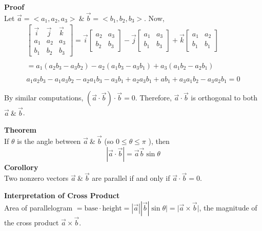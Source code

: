 \documentclass{article}
\begin{document}
  \textbf{Proof}\\
  Let $ \vec{ a } = < a_1, a_2, a_3> ~ \&~ \vec{ b } = < b_1, b_2, b_3>    $. Now,
  \[
    \begin{gathered}
    \begin{bmatrix}
      \vec{ i } & \vec{ j } & \vec{ k }\\
      a_1 &a_2 &a_3\\
      b_1 &b_2 &b_3
    \end{bmatrix}
    = \vec{ i } \begin{bmatrix}
      a_2 &a_3\\
      b_2 &b_3
    \end{bmatrix} - 
    \vec{ j } \begin{bmatrix}
      a_1 &a_3\\
      b_1 &b_3
    \end{bmatrix} + 
    \vec{ k } \begin{bmatrix}
      a_1 &a_2\\
      b_1 &b_1
    \end{bmatrix}\\
    ~\\
     = a_{1}  (a_2b_3-a_3b_2) - a_{2}  (a_1b_3 - a_3b_1) + a_{3} (a_1b_2 - a_2b_{1})\\
     ~\\
     a_{1}a_{2}b_{3}-a_{1}a_{3}b_{2}-a_{2}a_{1}b_{3}-a_{3}b_{1}+a_{2}a_{3}b_{1}+ab_{1}+a_{3}a_{1}b_{2}-a_{3}a_{2}b_{1}=0\\
     ~\\
    \end{gathered}
  \]
    By similar computations, $(\vec{a}\cdot \vec{b}) \cdot \vec{b}=0$. Therefore, $ \vec{a} \cdot \vec{b} $ is orthogonal to both $ \vec{a} ~\&~ \vec{b} $.

    \textbf{Theorem}\\
    If $ \theta $ is the angle between $ \vec{a} ~\&~ \vec{b}$ (so $ 0\le \theta \le \pi $ ), then  
    \[
     | \vec{a} \cdot  \vec{b}| = \vec{a} \vec{b} \sin{\theta}
    \]
    \textbf{Corollory}\\
    Two nonzero vectors $ \vec{a} ~\&~ \vec{b}$ are parallel if and only if $ \vec{a} \cdot \vec{b} = 0 .$
    
    \textbf{Interpretation of Cross Product}\\
    Area of parallelogram $ = \text{base} \cdot  \text{height} = | \vec{a} | |\vec{b}| \sin{\theta}|=| \vec{a} \times  \vec{b} |$, the magnitude of the cross product $ \vec{a} \times \vec{b} $. 
\end{document}
